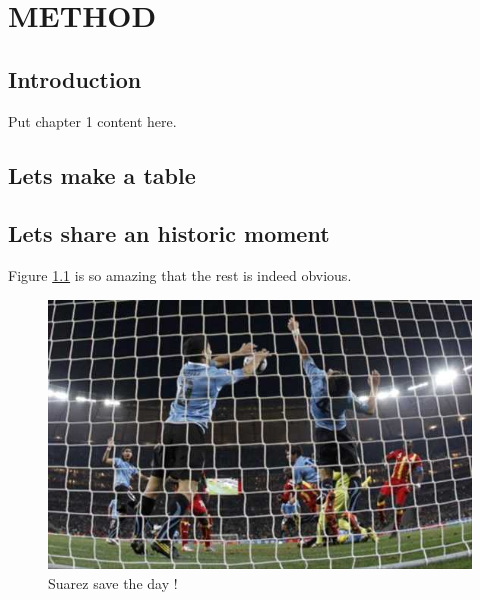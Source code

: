 \documentclass[11pt]{isuthesis}
\begin{document}


\tableofcontents
{} \cleardoublepage {}
{}
\listoftables
\cleardoublepage {} {}
\listoffigures



\cleardoublepage {}  
\cleardoublepage {}         



\newpage
{}




\chapter{METHOD}

\section{Introduction}
Put chapter 1 content here. \cite{lorenz2014using}


\section{Lets make a table} 
 

\section{Lets share an historic moment}

Figure \ref{history} is so amazing  that the rest is indeed obvious.

\begin{figure}[h!tb] \centering
\includegraphics{history}
\caption{Suarez save the day !}
\label{history}
\end{figure}



%
%


\renewcommand{\bibname}{\centerline{BIBLIOGRAPHY}}
\unappendixtitle
\newpage
{}


\end{document}
